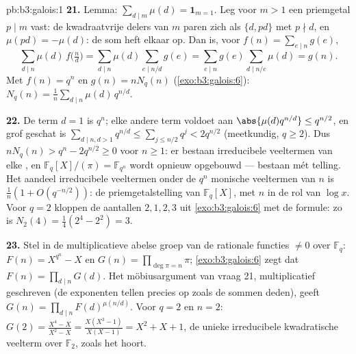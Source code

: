 \begin{solution}{pb:b3:galois:1}
\textbf{21.} Lemma: $\sum_{d \mid m}\mu(d) = \mathbf 1_{m=1}$. Leg
voor $m > 1$ een priemgetal $p \mid m$ vast: de kwadraatvrije
delers van $m$ paren zich als $\{d, pd\}$ met $p \nmid d$, en
$\mu(pd) = -\mu(d)$: de som heft elkaar op. Dan is, voor $f(n) =
\sum_{e\mid n}g(e)$,
\[
\sum_{d \mid n}\mu(d)\,f\bigl(\tfrac nd\bigr)
= \sum_{d \mid n}\mu(d)\!\!\sum_{e \mid n/d}\!\!g(e)
= \sum_{e \mid n}g(e)\!\!\sum_{d \mid n/e}\!\!\mu(d)
= g(n) .
\]
Met $f(n) = q^n$ en $g(n) = nN_q(n)$ (\cref{exo:b3:galois:6}):
$N_q(n) = \frac1n\sum_{d\mid n}\mu(d)\,q^{n/d}$.

\textbf{22.} De term $d = 1$ is $q^n$; elke andere term voldoet
aan $\abs{\mu(d)q^{n/d}} \leq q^{n/2}$, en grof geschat is
$\sum_{d \mid n, d > 1}q^{n/d} \leq \sum_{j \leq n/2}q^j <
2q^{n/2}$ (meetkundig, $q \geq 2$). Dus $nN_q(n) > q^n - 2q^{n/2}
\geq 0$ voor $n \geq 1$: er bestaan irreducibele veeltermen van
elke , en $\mathbb F_q[X]/(\pi) = \mathbb F_{q^n}$ wordt
opnieuw opgebouwd --- bestaan mét telling. Het aandeel
irreducibele veeltermen onder de $q^n$ monische veeltermen van
 $n$ is $\frac1n(1 + O(q^{-n/2}))$: de priemgetalstelling van
$\mathbb F_q[X]$, met $n$ in de rol van $\log x$. Voor $q = 2$
kloppen de aantallen $2, 1, 2, 3$ uit \cref{exo:b3:galois:6} met
de formule: zo is $N_2(4) = \frac14(2^4 - 2^2) = 3$.

\textbf{23.} Stel in de multiplicatieve abelse groep van de
rationale functies $\neq 0$ over $\mathbb F_q$: $F(n) = X^{q^n} -
X$ en $G(n) = \prod_{\deg\pi = n}\pi$; \cref{exo:b3:galois:6} zegt
dat $F(n) = \prod_{d\mid n}G(d)$. Het möbiusargument van vraag 21,
multiplicatief geschreven (de exponenten tellen precies op zoals
de sommen deden), geeft $G(n) = \prod_{d \mid n}F(d)^{\mu(n/d)}$.
Voor $q = 2$ en $n = 2$: $G(2) = \frac{X^4 - X}{X^2 - X} =
\frac{X(X^3 - 1)}{X(X - 1)} = X^2 + X + 1$, de unieke irreducibele
kwadratische veelterm over $\mathbb F_2$, zoals het hoort.


\end{solution}

